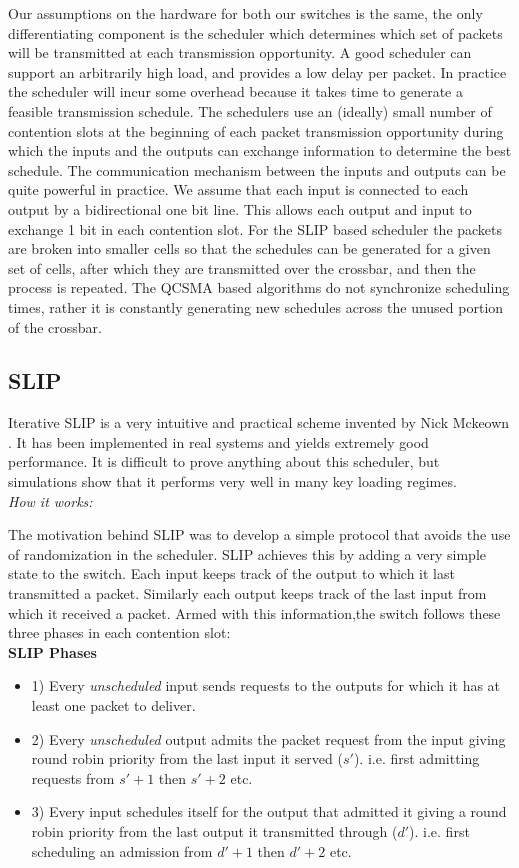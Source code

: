 \documentclass[11pt]{article}%
\begin{document}
Our assumptions on the hardware for both our switches is the same, the only differentiating component is the scheduler which determines which set of packets will be transmitted at each transmission opportunity.  A good scheduler can support an arbitrarily high load, and provides a low delay per packet.  In practice the scheduler will incur some overhead because it takes time to generate a feasible transmission schedule.  The schedulers use an (ideally) small number of contention slots at the beginning of each packet transmission opportunity during which the inputs and the outputs can exchange information to determine the best schedule.  The communication mechanism between the inputs and outputs can be quite powerful in practice.  We assume that each input is connected to each output by a bidirectional one bit line. This allows each output and input to exchange 1 bit in each contention slot.  For the SLIP based scheduler the packets are broken into smaller cells so that the schedules can be generated for a given set of cells, after which they are transmitted over the crossbar, and then the process is repeated.  The QCSMA based algorithms do not synchronize scheduling times, rather it is constantly generating new schedules across the unused portion of the crossbar.

\subsection{SLIP}

Iterative SLIP is a very intuitive and practical scheme invented by Nick Mckeown \cite{McKeown}.  It has been implemented in real systems and yields extremely good performance.  It is difficult to prove anything about this scheduler, but simulations show that it performs very well in many key loading regimes.\\

{\it How it works:}

The motivation behind SLIP was to develop a simple protocol that avoids the use of randomization in the scheduler.  SLIP achieves this by adding a very simple state to the switch.  Each input keeps track of the output to which it last transmitted a packet.  Similarly each output keeps track of the last input from which it received a packet.  Armed with this information,the switch follows these three phases in each contention slot:\\

{\bf SLIP Phases}
\begin{itemize}
\item 1) Every {\it unscheduled} input sends requests to the outputs for which it has at least one packet to deliver.
\item 2) Every {\it unscheduled} output admits the packet request from the input giving round robin priority from the last input it served ($s'$). i.e. first admitting requests from $s'+1$ then $s'+2$ etc.
\item 3) Every input schedules itself for the output that admitted it giving a round robin priority from the last output it transmitted through ($d'$).  i.e. first scheduling an admission from $d'+1$ then $d'+2$ etc.\\
\end{itemize}
\end{document}
